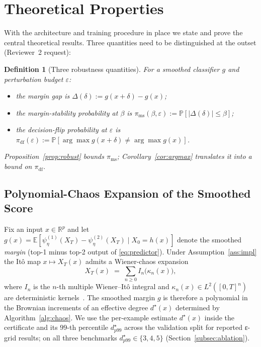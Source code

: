 \documentclass{ieeeaccess}
\newtheorem{definition}[theorem]{Definition}
\newcommand{\Real}{\mathbb{R}}
\newcommand{\Exp}{\mathbb{E}}
\newcommand{\Prob}{\mathbb{P}}
\begin{document}
\section{Theoretical Properties}\label{sec:theory}
With the architecture and training procedure in place we state and prove
the central theoretical results. Three quantities need to be
distinguished at the outset (Reviewer~2 request):
\begin{definition}[Three robustness quantities]\label{def:rq}
For a smoothed classifier $g$ and perturbation budget $\varepsilon$:
\begin{itemize}[leftmargin=1.2em,itemsep=0.2em,topsep=0.2em]
  \item the \emph{margin gap} is $\Delta(\delta)\!:=\!g(x{+}\delta){-}g(x)$;
  \item the \emph{margin-stability probability} at $\beta$ is
        $\pi_{\mathrm{ms}}(\beta,\varepsilon)\!:=\!\Prob[|\Delta(\delta)|\!\leq\!\beta]$;
  \item the \emph{decision-flip probability} at $\varepsilon$ is
        $\pi_{\mathrm{df}}(\varepsilon)\!:=\!
         \Prob[\arg\max g(x{+}\delta)\neq\arg\max g(x)]$.
\end{itemize}
Proposition~\ref{prop:robust} bounds $\pi_{\mathrm{ms}}$;
Corollary~\ref{cor:argmax} translates it into a bound on
$\pi_{\mathrm{df}}$.
\end{definition}

\subsection{Polynomial-Chaos Expansion of the Smoothed Score}
Fix an input $x\in\Real^p$ and let
$g(x)=\Exp[\psi_\eta^{(1)}(X_T)-\psi_\eta^{(2)}(X_T)\mid X_0=h(x)]$
denote the smoothed \emph{margin} (top-1 minus top-2 output of
\eqref{eq:predictor}). Under Assumption~\ref{ass:impl} the It\^o map
$x\mapsto X_T(x)$ admits a Wiener-chaos expansion
\begin{equation}\label{eq:chaos}
  X_T(x)\;=\;\sum_{n\geq 0} I_n\bigl(\kappa_n(x)\bigr),
\end{equation}
where $I_n$ is the $n$-th multiple Wiener--It\^o integral and
$\kappa_n(x)\in L^2([0,T]^n)$ are deterministic
kernels~\cite{nualart2006malliavin}. The smoothed margin $g$ is
therefore a polynomial in the Brownian increments of an effective
degree $d^\star(x)$ determined by Algorithm~\ref{alg:chaos}. We use the
per-example estimate $d^\star(x)$ inside the certificate and its
$99$-th percentile $d^\star_{p99}$ across the validation split for
reported ε-grid results; on all three benchmarks
$d^\star_{p99}\in\{3,4,5\}$ (Section~\ref{subsec:ablation}).
\end{document}
